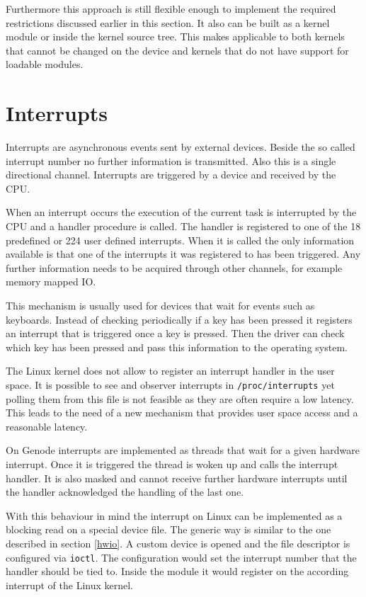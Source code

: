 \documentclass[
a4paper,
12pt,
notitlepage,
parskip=half,
DIV=11,
]{scrbook}
\begin{document}
		Furthermore this approach is still flexible enough to implement the required restrictions discussed earlier in this section.
		It also can be built as a kernel module or inside the kernel source tree.
		This makes applicable to both kernels that cannot be changed on the device and kernels that do not have support for loadable modules.
		
		\section{Interrupts}
		\label{irq}
		
		Interrupts are asynchronous events sent by external devices.
		Beside the so called interrupt number no further information is transmitted.
		Also this is a single directional channel.
		Interrupts are triggered by a device and received by the CPU.
		
		When an interrupt occurs the execution of the current task is interrupted by the CPU and a handler procedure is called.
		The handler is registered to one of the 18 predefined or 224 user defined interrupts.
		When it is called the only information available is that one of the interrupts it was registered to has been triggered.
		Any further information needs to be acquired through other channels, for example memory mapped IO. \citep{intelmanual}
		
		This mechanism is usually used for devices that wait for events such as keyboards.
		Instead of checking periodically if a key has been pressed it registers an interrupt that is triggered once a key is pressed.
		Then the driver can check which key has been pressed and pass this information to the operating system.
		
		The Linux kernel does not allow to register an interrupt handler in the user space.
		It is possible to see and observer interrupts in \texttt{/proc/interrupts} yet polling them from this file is not feasible as they are often require a low latency.
		This leads to the need of a new mechanism that provides user space access and a reasonable latency.
		
		On Genode interrupts are implemented as threads that wait for a given hardware interrupt.
		Once it is triggered the thread is woken up and calls the interrupt handler.
		It is also masked and cannot receive further hardware interrupts until the handler acknowledged the handling of the last one. \citep{genode}
		
		With this behaviour in mind the interrupt on Linux can be implemented as a blocking read on a special device file.
		The generic way is similar to the one described in section \ref{hwio}.
		A custom device is opened and the file descriptor is configured via \texttt{ioctl}.
		The configuration would set the interrupt number that the handler should be tied to.
		Inside the module it would register on the according interrupt of the Linux kernel.
		
\end{document}
